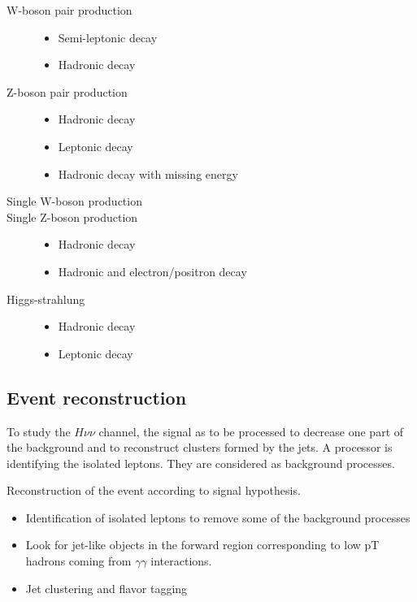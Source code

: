    
   \begin{description}
      \item[W-boson pair production] 
      \begin{itemize}
        \item Semi-leptonic decay
        \item Hadronic decay
      \end{itemize}
      \item[Z-boson pair production]
      \begin{itemize}
        \item Hadronic decay
        \item Leptonic decay
        \item Hadronic decay with missing energy
      \end{itemize}
      \item[Single W-boson production]
      \item[Single Z-boson production]
      \begin{itemize}
        \item Hadronic decay
        \item Hadronic and electron/positron decay
      \end{itemize}
      \item[Higgs-strahlung]
      \begin{itemize}
        \item Hadronic decay
        \item Leptonic decay
      \end{itemize}
   \end{description}
 
  \subsection{Event reconstruction}

  To study the $H \nu\nu$ channel, the signal as to be processed to decrease one part of the background and to reconstruct clusters formed by the jets.
  A processor is identifying the isolated leptons. 
  They are considered as background processes.

  Reconstruction of the event according to signal hypothesis.

  \begin{itemize}
    \item Identification of isolated leptons to remove some of the background processes
    \item Look for jet-like objects in the forward region corresponding to low pT hadrons coming from $\gamma \gamma$ interactions.
    \item Jet clustering and flavor tagging
  \end{itemize}

